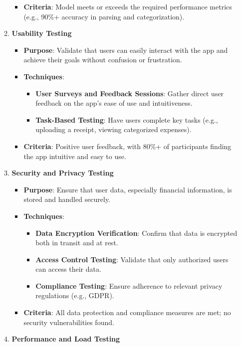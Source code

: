 \documentclass[12pt, titlepage]{article}
\begin{document}
\begin{enumerate}
\begin{enumerate}
\begin{itemize}
\begin{itemize}
			\end{itemize}
			\item \textbf{Criteria}: Model meets or exceeds the required performance metrics (e.g., 90\%+ accuracy in parsing and categorization).
		\end{itemize}
		\item \textbf{Usability Testing}
		\begin{itemize}
			\item \textbf{Purpose}: Validate that users can easily interact with the app and achieve their goals without confusion or frustration.
			\item \textbf{Techniques}:
			\begin{itemize}
				\item \textbf{User Surveys and Feedback Sessions}: Gather direct user feedback on the app's ease of use and intuitiveness.
				\item \textbf{Task-Based Testing}: Have users complete key tasks (e.g., uploading a receipt, viewing categorized expenses).
			\end{itemize}
			\item \textbf{Criteria}: Positive user feedback, with 80\%+ of participants finding the app intuitive and easy to use.
		\end{itemize}
		\item \textbf{Security and Privacy Testing}
		\begin{itemize}
			\item \textbf{Purpose}: Ensure that user data, especially financial information, is stored and handled securely.
			\item \textbf{Techniques}: 
			\begin{itemize}
				\item \textbf{Data Encryption Verification}: Confirm that data is encrypted both in transit and at rest.
				\item \textbf{Access Control Testing}: Validate that only authorized users can access their data.
				\item \textbf{Compliance Testing}: Ensure adherence to relevant privacy regulations (e.g., GDPR).
			\end{itemize}
			\item \textbf{Criteria}: All data protection and compliance measures are met; no security vulnerabilities found.
		\end{itemize}
		\item \textbf{Performance and Load Testing}
		\begin{itemize}

\end{itemize}
\end{enumerate}
\end{enumerate}
\end{document}
